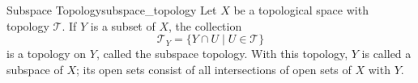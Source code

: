 \begin{definition}{Subspace Topology}{subspace_topology}
    Let $X$ be a topological space with topology $\mathcal{T}$. If $Y$ is a subset of $X$, the collection
    \[
    \mathcal{T}_{Y}=\{Y \cap U \mid U \in \mathcal{T}\}
    \]
    is a topology on $Y$, called the subspace topology. With this topology, $Y$ is called a subspace of $X$; its open sets consist of all intersections of open sets of $X$ with $Y$.
\end{definition}
